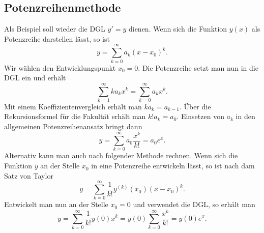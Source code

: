\documentclass[a4paper,10pt,fleqn,twocolumn,twoside,openany]{article}
\numberwithin{equation}{section}
\theoremstyle{definition}
\begin{document}
\subsection{Potenzreihenmethode}

Als Beispiel soll wieder die DGL $y'=y$ dienen.
Wenn sich die Funktion $y(x)$ als Potenzreihe darstellen lässt, so ist
\begin{equation}
y=\sum_{k=0}^\infty a_k(x-x_0)^k.
\end{equation}
Wir wählen den Entwicklungspunkt $x_0=0$. Die Potenzreihe setzt man
nun in die DGL ein und erhält
\begin{equation}
\sum_{k=1}^\infty ka_kx^k = \sum_{k=0}^\infty a_kx^k.
\end{equation}
Mit einem Koeffizientenvergleich erhält man $ka_k=a_{k-1}$.
Über die Rekursionsformel für die Fakultät erhält man $k!a_k=a_0$.
Einsetzen von $a_k$ in den allgemeinen Potenzreihenansatz bringt dann
\begin{equation}
y=\sum_{k=0}^\infty a_0\frac{x^k}{k!} = a_0e^x.
\end{equation}
Alternativ kann man auch nach folgender Methode rechnen.
Wenn sich die Funktion $y$ an der Stelle $x_0$ in eine Potenzreihe
entwickeln lässt, so ist nach dam Satz von Taylor
\begin{equation}
y = \sum_{k=0}^\infty \frac{1}{k!}y^{(k)}(x_0)(x-x_0)^k.
\end{equation}
Entwickelt man nun an der Stelle $x_0=0$ und verwendet die DGL,
so erhält man
\begin{equation}
y = \sum_{k=0}^\infty \frac{1}{k!}y(0)x^k
= y(0)\sum_{k=0}^\infty \frac{x^k}{k!}
= y(0)e^x.
\end{equation}
\end{document}
